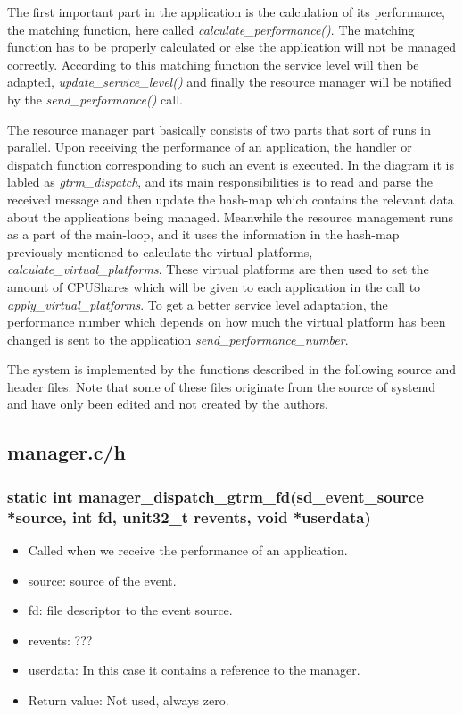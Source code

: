 \documentclass[nobiblatex]{LTHthesis}
\begin{document}
The first important part in the application is the calculation of its performance, the matching function, here called \emph{calculate\_performance()}. The matching function has to be properly calculated or else the application will not be managed correctly. According to this matching function the service level will then be adapted, \emph{update\_service\_level()} and finally the resource manager will be notified by the \emph{send\_performance()} call.

The resource manager part basically consists of two parts that sort of runs in parallel. Upon receiving the performance of an application, the handler or dispatch function corresponding to such an event is executed. In the diagram it is labled as \emph{gtrm\_dispatch}, and its main responsibilities is to read and parse the received message and then update the hash-map which contains the relevant data about the applications being managed. Meanwhile the resource management runs as a part of the main-loop, and it uses the information in the hash-map previously mentioned to calculate the virtual platforms, \emph{calculate\_virtual\_platforms}. These virtual platforms are then used to set the amount of CPUShares which will be given to each application in the call to \emph{apply\_virtual\_platforms}. To get a better service level adaptation, the performance number which depends on how much the virtual platform has been changed is sent to the application \emph{send\_performance\_number}.

The system is implemented by the functions described in the following source and header files. Note that some of these files originate from the source of systemd and have only been edited and not created by the authors.

\subsection{manager.c/h}
\subsubsection{static int manager\_dispatch\_gtrm\_fd(sd\_event\_source *source, int fd, unit32\_t revents, void *userdata)}
\begin{itemize}
\item Called when we receive the performance of an application.
\item source: source of the event.
\item fd: file descriptor to the event source.
\item revents: ???
\item userdata: In this case it contains a reference to the manager.
\item Return value: Not used, always zero.
\end{itemize}
\end{document}

